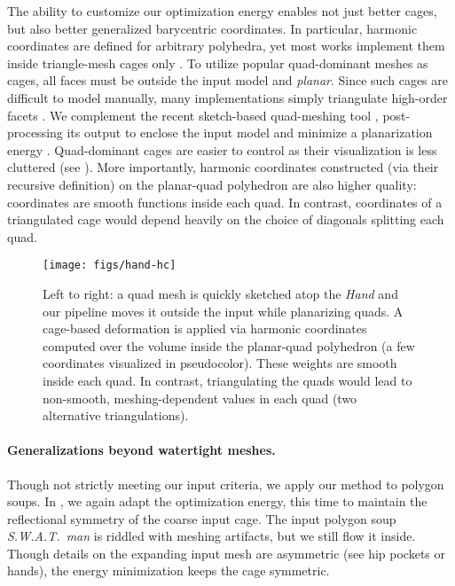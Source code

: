 The ability to customize our optimization energy enables not just better cages,
but also better generalized barycentric coordinates. In particular, harmonic
coordinates are defined for arbitrary polyhedra, yet most works implement them
inside triangle-mesh cages only \cite{HarmonicCoodinates07}.
%
To utilize popular quad-dominant meshes as cages, all faces must be outside the
input model and \emph{planar}.
%
Since such cages are difficult to model manually, many implementations simply
triangulate high-order facets \cite{HarmonicCoodinates07}.
%
We complement the recent sketch-based quad-meshing tool \cite{Takayama:2013},
post-processing its output to enclose the input model and minimize a
planarization energy \cite{poranne2013interactive}.
%
Quad-dominant cages are easier to control as their visualization is less
cluttered (see ).
%
More importantly, harmonic coordinates constructed (via their recursive
definition) on the planar-quad polyhedron are also higher quality: coordinates
are smooth functions inside each quad.
%
In contrast, coordinates of a triangulated cage would depend heavily on the
choice of diagonals splitting each quad.

\begin{figure}
  \texttt{[image: figs/hand-hc]}
  \caption{Left to right: a quad mesh is quickly sketched atop the \emph{Hand}
  and our pipeline moves it outside the input while planarizing quads. A
  cage-based deformation is applied via harmonic coordinates computed over the
  volume inside the planar-quad polyhedron (a few coordinates visualized in
  pseudocolor). These weights are smooth inside each quad. In contrast,
  triangulating the quads would lead to non-smooth, meshing-dependent values in
  each quad (two alternative triangulations).}
  \label{fig:hand-hc}
\end{figure}

\paragraph{Generalizations beyond watertight meshes.}
%
Though not strictly meeting our input criteria, we apply our method to
polygon soups. %
%
In , we again adapt the optimization energy, this time to
maintain the reflectional symmetry of the coarse input cage.
%
The input polygon soup \emph{S.W.A.T.\ man} is riddled with meshing artifacts,
but we still flow it inside.
%
Though details on the expanding input mesh are asymmetric (see hip pockets or
hands), the energy minimization keeps the cage symmetric.
%
%

